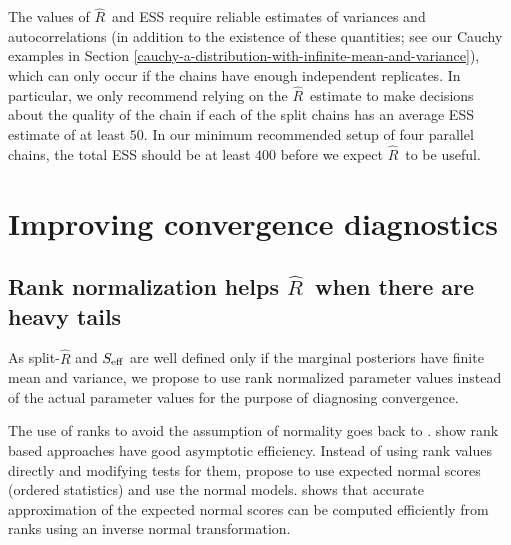 \documentclass[american,]{article}
\DeclareMathOperator{\var}{var}
\newcommand{\Rhat}{$\widehat{R}$}
\theoremstyle{definition}
\begin{document}

The values of \Rhat\ and ESS require reliable estimates of variances and autocorrelations
(in addition to the existence of these quantities; see our Cauchy examples in Section 
\ref{cauchy-a-distribution-with-infinite-mean-and-variance}), which can
only occur if the chains have enough independent replicates. In particular, we only recommend 
relying on the \Rhat\ estimate to make decisions about the quality of the chain if each of the 
split chains has an average ESS estimate of at least $50$. In our minimum recommended setup of four
parallel chains, the total ESS should be at least $400$ before we expect  \Rhat\ to be useful.


\hypertarget{improving-convergence-diagnostics}{%
\section{Improving convergence
diagnostics}\label{improving-convergence-diagnostics}}

\hypertarget{rank-normalization}{%
\subsection{Rank normalization helps  \Rhat\ when there are heavy tails}\label{rank-normalization}}

As split-\(\widehat{R}\) and \(S_{\rm eff}\) are well defined
only if the marginal posteriors have finite mean and variance, we
propose to use rank normalized parameter values instead of the actual
parameter values for the purpose of diagnosing convergence.

The use of ranks to avoid the assumption of normality goes back to
\citet{Friedman:1937}. \citet{Chernoff+Savage:1958} show rank based
approaches have good asymptotic efficiency. Instead of using rank
values directly and modifying tests for them,
\citet{Fisher+Yates:1938} propose to use expected normal scores
(ordered statistics) and use the normal models. \citet{Blom:1958}
shows that accurate approximation of the expected normal scores can
be computed efficiently from ranks using an inverse normal transformation.
\end{document}

